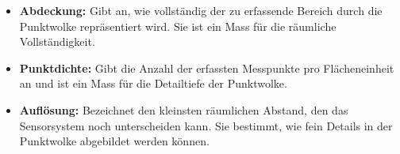\begin{German}
\begin{itemize}
        \item \textbf{Abdeckung:} Gibt an, wie vollständig der zu erfassende Bereich durch die Punktwolke repräsentiert wird. Sie ist ein Mass für die räumliche Vollständigkeit. \cite{wieserKursGeodaetischeMesstechnik}
        
        \item \textbf{Punktdichte:} Gibt die Anzahl der erfassten Messpunkte pro Flächeneinheit an und ist ein Mass für die Detailtiefe der Punktwolke. \cite{wieserKursGeodaetischeMesstechnik}
        
        \item \textbf{Auflösung:} Bezeichnet den kleinsten räumlichen Abstand, den das Sensorsystem noch unterscheiden kann. Sie bestimmt, wie fein Details in der Punktwolke abgebildet werden können. \cite{wieserKursGeodaetischeMesstechnik}
    \end{itemize}

\end{German}

